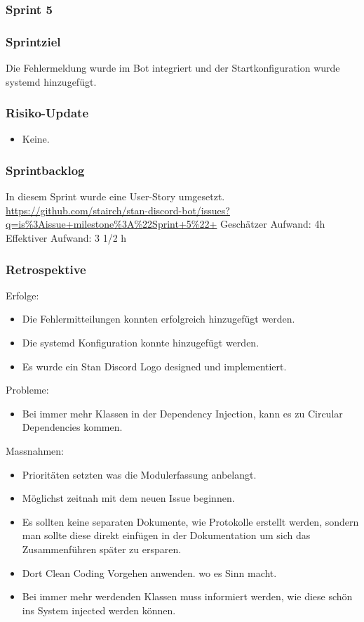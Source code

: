 \documentclass[a4paper, table]{article}
\begin{document}
\newpage
\subsubsection{Sprint 5}
\subsubsection*{Sprintziel}
Die Fehlermeldung wurde im Bot integriert und der Startkonfiguration wurde systemd hinzugefügt.

\subsubsection*{Risiko-Update}
\begin{itemize}
    \item Keine.
\end{itemize}

\subsubsection*{Sprintbacklog}
In diesem Sprint wurde eine User-Story umgesetzt.\\
\url{https://github.com/stairch/stan-discord-bot/issues?q=is%3Aissue+milestone%3A%22Sprint+5%22+}
\newline
Geschätzer Aufwand: 4h
\newline
Effektiver Aufwand: 3 1/2 h

\subsubsection*{Retrospektive}
Erfolge:
\begin{itemize}
    \item Die Fehlermitteilungen konnten erfolgreich hinzugefügt werden.
    \item Die systemd Konfiguration konnte hinzugefügt werden.
    \item Es wurde ein Stan Discord Logo designed und implementiert.
\end{itemize}
Probleme:
\begin{itemize}
    \item Bei immer mehr Klassen in der Dependency Injection, kann es zu Circular Dependencies kommen.
\end{itemize}
Massnahmen:
\begin{itemize}
    \item Prioritäten setzten was die Modulerfassung anbelangt.
    \item Möglichst zeitnah mit dem neuen Issue beginnen.
    \item Es sollten keine separaten Dokumente, wie Protokolle erstellt werden, sondern man sollte diese direkt einfügen in der Dokumentation um sich das Zusammenführen später zu ersparen.
    \item Dort Clean Coding Vorgehen anwenden. wo es Sinn macht.
    \item Bei immer mehr werdenden Klassen muss informiert werden, wie diese schön ins System injected werden können.
\end{itemize}
\end{document}
